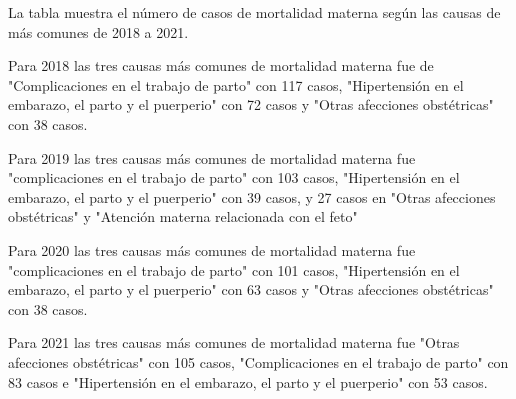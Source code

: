 La tabla muestra el número de casos de mortalidad materna según las causas de más comunes de 2018 a 2021. 

Para 2018 las tres causas más comunes de mortalidad materna fue de  "Complicaciones en el trabajo de parto" con 117 casos, "Hipertensión en el embarazo, el parto y el puerperio" con 72 casos y "Otras afecciones obstétricas" con 38 casos. 

Para 2019 las tres causas más comunes de mortalidad materna fue "complicaciones en el trabajo de parto" con 103 casos, "Hipertensión en el embarazo, el parto y el puerperio" con 39 casos, y 27 casos en "Otras afecciones obstétricas" y "Atención materna relacionada con el feto"

Para 2020 las tres causas más comunes de mortalidad materna fue "complicaciones en el trabajo de parto" con 101 casos, "Hipertensión en el embarazo, el parto y el puerperio" con 63 casos y "Otras afecciones obstétricas" con 38 casos. 

Para 2021 las tres causas más comunes de mortalidad materna fue "Otras afecciones obstétricas" con 105 casos, "Complicaciones en el trabajo de parto" con 83 casos e "Hipertensión en el embarazo, el parto y el puerperio" con 53 casos.